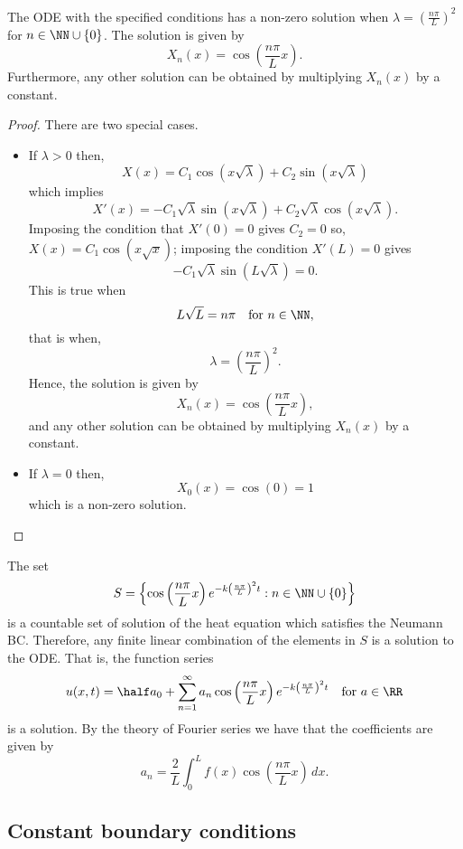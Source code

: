 \documentclass[12pt, a4paper]{article}
\begin{document}
\begin{mdthm}
    The ODE with the specified conditions has a non-zero solution when \(\lambda =\left( \frac{n\pi}{L} \right)^2\) for \(n \in \NN \cup \{0\}\). The solution is given by
    \[X_n(x)= \cos\left( \frac{n\pi}{L} x\right).\]
    Furthermore, any other solution can be obtained by multiplying \(X_n(x)\) by a constant.
\end{mdthm}

\begin{proof}
    There are two special cases.
    \begin{itemize}
        \item If \(\lambda>0\) then, 
        \[X(x) = C_1 \cos(x\sqrt{\lambda})+C_2 \sin(x\sqrt{\lambda})\]
        which implies 
        \[X'(x)=-C_1\sqrt{\lambda}\sin(x\sqrt{\lambda})+C_2 \sqrt{\lambda}\cos(x\sqrt{\lambda}).\]
        Imposing the condition that \(X'(0)=0\) gives \(C_2 =0\) so,\(X(x)=C_1\cos(x\sqrt{x})\); imposing the condition \(X'(L)=0\) gives 
        \[-C_1\sqrt{\lambda}\sin(L\sqrt{\lambda})=0.\]
        This is true when 
        \[L\sqrt{L} = n \pi \quad \text{for } n \in \NN,\]
        that is when,
        \[\lambda = \left( \frac{n\pi}{L}\right)^2.\]
        Hence, the solution is given by 
        \[X_n(x)= \cos\left( \frac{n\pi}{L} x\right),\]
        and any other solution can be obtained by multiplying \(X_n(x)\) by a constant.
        \item If \(\lambda =0\) then,
        \[X_0(x) = \cos(0)=1\]
        which is a non-zero solution.
    \end{itemize}
\end{proof}

\begin{mdremark}
    The set 
    \[S = \left\{ \cos\left( \frac{n\pi}{L}x \right)e^{-k \left( \frac{n\pi}{L} \right)^2 t} : n \in \NN \cup \{0\} \right\}\]
    is a countable set of solution of the heat equation which satisfies the Neumann BC. Therefore, any finite linear combination of the elements in \(S\) is a solution to the ODE. That is, the function series 
    \[u(x,t) = \half a_0 + \sum_{n=1}^{\infty} a_n \cos \left( \frac{n\pi}{L}x \right) e^{-k \left( \frac{n\pi}{L} \right)^2 t} \quad \text{for } a\in \RR\]
    is a solution. By the theory of Fourier series we have that the coefficients are given by 
    \[a_n = \frac{2}{L} \int_0^L f(x)\cos\left( \frac{n\pi}{L}x \right) \, dx.\]
\end{mdremark}

\subsection{Constant boundary conditions}
\end{document}
